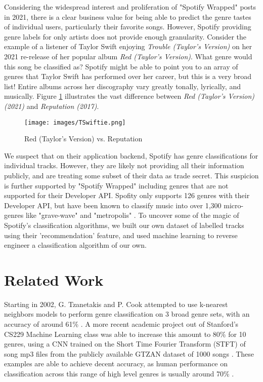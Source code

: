 \documentclass[conference]{IEEEtran}
\begin{document}
Considering the widespread interest and proliferation of "Spotify Wrapped" posts in 2021, there is a clear business value for being able to predict the genre tastes of individual users, particularly their favorite songs. However, Spotify providing genre labels for only artists does not provide enough granularity. Consider the example of a listener of Taylor Swift enjoying \emph{Trouble (Taylor's Version)} on her 2021 re-release of her popular album \emph{Red (Taylor's Version)}. What genre would this song be classified as? Spotify might be able to point you to an array of genres that Taylor Swift has performed over her career, but this is a very broad list! Entire albums across her discography vary greatly tonally, lyrically, and musically. Figure \ref{fig:TSwiftie} illustrates the vast difference between \emph{Red (Taylor's Version) (2021)} and \emph{Reputation (2017)}.

\begin{figure}[htbp]
\centerline{\texttt{[image: images/TSwiftie.png]}}
\caption{Red (Taylor's Version) vs. Reputation}
\label{fig:TSwiftie}
\end{figure}

We suspect that on their application backend, Spotify has genre classifications for individual tracks. However, they are likely not providing all their information publicly, and are treating some subset of their data as trade secret. This suspicion is further supported by "Spotify Wrapped" including genres that are not supported for their Developer API. Spofity only supports 126 genres with their Developer API, but have been known to classify music into over 1,300 micro-genres like "grave-wave" and "metropolis" \cite{b1}. To uncover some of the magic of Spotify's classification algorithms, we built our own dataset of labelled tracks using their 'recommendation' feature, and used machine learning to reverse engineer a classification algorithm of our own. 

\section{Related Work}

Starting in 2002,  G. Tzanetakis and P. Cook attempted to use k-nearest neighbors models to perform genre classification on 3 broad genre sets, with an accuracy of around 61\% \cite{b2}. A more recent academic project out of Stanford's CS229 Machine Learning class was able to increase this amount to 80\% for 10 genres, using a CNN trained on the Short Time Fourier Transform (STFT) of song mp3 files from the publicly available GTZAN dataset of 1000 songs \cite{b3}. These examples are able to achieve decent accuracy, as human performance on classification across this range of high level genres is usually around 70\% \cite{b4}.
\end{document}
